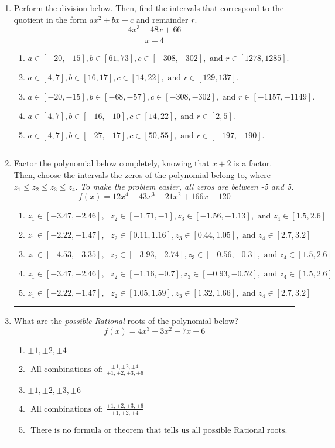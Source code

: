 \documentclass[14pt]{extbook}
\newcommand{\litem}[1]{\item#1\hspace*{-1cm}\rule{\textwidth}{0.4pt}}
\begin{document}
\begin{enumerate}
{\begin{enumerate}[label=\Alph*.]
\end{enumerate} }
\litem{
Perform the division below. Then, find the intervals that correspond to the quotient in the form $ax^2+bx+c$ and remainder $r$.\[ \frac{4x^{3} -48 x + 66}{x + 4} \]\begin{enumerate}[label=\Alph*.]
\item \( a \in [-20, -15], b \in [61, 73], c \in [-308, -302], \text{ and } r \in [1278, 1285]. \)
\item \( a \in [4, 7], b \in [16, 17], c \in [14, 22], \text{ and } r \in [129, 137]. \)
\item \( a \in [-20, -15], b \in [-68, -57], c \in [-308, -302], \text{ and } r \in [-1157, -1149]. \)
\item \( a \in [4, 7], b \in [-16, -10], c \in [14, 22], \text{ and } r \in [2, 5]. \)
\item \( a \in [4, 7], b \in [-27, -17], c \in [50, 55], \text{ and } r \in [-197, -190]. \)

\end{enumerate} }
\litem{
Factor the polynomial below completely, knowing that $x + 2$ is a factor. Then, choose the intervals the zeros of the polynomial belong to, where $z_1 \leq z_2 \leq z_3 \leq z_4$. \textit{To make the problem easier, all zeros are between -5 and 5.}\[ f(x) = 12x^{4} -43 x^{3} -21 x^{2} +166 x -120 \]\begin{enumerate}[label=\Alph*.]
\item \( z_1 \in [-3.47, -2.46], \text{   }  z_2 \in [-1.71, -1], z_3 \in [-1.56, -1.13], \text{   and   } z_4 \in [1.5, 2.6] \)
\item \( z_1 \in [-2.22, -1.47], \text{   }  z_2 \in [0.11, 1.16], z_3 \in [0.44, 1.05], \text{   and   } z_4 \in [2.7, 3.2] \)
\item \( z_1 \in [-4.53, -3.35], \text{   }  z_2 \in [-3.93, -2.74], z_3 \in [-0.56, -0.3], \text{   and   } z_4 \in [1.5, 2.6] \)
\item \( z_1 \in [-3.47, -2.46], \text{   }  z_2 \in [-1.16, -0.7], z_3 \in [-0.93, -0.52], \text{   and   } z_4 \in [1.5, 2.6] \)
\item \( z_1 \in [-2.22, -1.47], \text{   }  z_2 \in [1.05, 1.59], z_3 \in [1.32, 1.66], \text{   and   } z_4 \in [2.7, 3.2] \)

\end{enumerate} }
\litem{
What are the \textit{possible Rational} roots of the polynomial below?\[ f(x) = 4x^{3} +3 x^{2} +7 x + 6 \]\begin{enumerate}[label=\Alph*.]
\item \( \pm 1,\pm 2,\pm 4 \)
\item \( \text{ All combinations of: }\frac{\pm 1,\pm 2,\pm 4}{\pm 1,\pm 2,\pm 3,\pm 6} \)
\item \( \pm 1,\pm 2,\pm 3,\pm 6 \)
\item \( \text{ All combinations of: }\frac{\pm 1,\pm 2,\pm 3,\pm 6}{\pm 1,\pm 2,\pm 4} \)
\item \( \text{ There is no formula or theorem that tells us all possible Rational roots.} \)


\end{enumerate}}
\end{enumerate}
\end{document}
